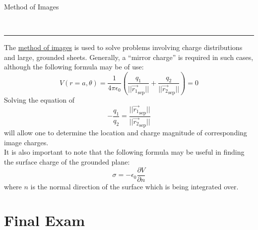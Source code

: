 \documentclass{article}
\newcommand{\header}[1]{\begin{large}\noindent #1\end{large}\\\rule{\textwidth}{0.5pt}}
\newcommand{\gap}{\medskip\\}
\begin{document}
\pagebreak

\header{Method of Images}
The \underline{method of images} is used to solve problems involving charge distributions
and large, grounded sheets. Generally, a ``mirror charge'' is required in such cases, 
although the following formula may be of use:
\[
    V(r = a, \theta) = \frac{1}{4\pi \epsilon_0} \left(\frac{q_1}{||\vec{r_1}_\textrm{sep}||} + \frac{q_2}{||\vec{r_2}_\textrm{sep}||}\right) = 0
\]
Solving the equation of
\[
    -\frac{q_1}{q_2} = \frac{||\vec{r_1}_\textrm{sep}||}{||\vec{r_2}_\textrm{sep}||}
\]
will allow one to determine the location and charge magnitude of corresponding image charges.
\gap
It is also important to note that the following formula may be useful in finding the 
surface charge of the grounded plane:
\[
    \sigma = - \epsilon_0 \frac{\partial V}{\partial n}
\]
where $n$ is the normal direction of the surface which is being integrated over.

\section*{Final Exam}
\end{document}
